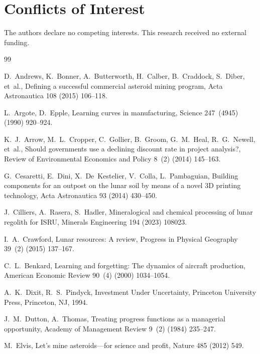 \documentclass[preprint,12pt]{elsarticle}
\begin{document}
\section*{Conflicts of Interest}

The authors declare no competing interests. This research received no external funding.

\begin{thebibliography}{99}

D.~Andrews, K.~Bonner, A.~Butterworth, H.~Calber, B.~Craddock, S.~Diber, et~al.,
\newblock Defining a successful commercial asteroid mining program,
\newblock Acta Astronautica 108 (2015) 106--118.

L.~Argote, D.~Epple,
\newblock Learning curves in manufacturing,
\newblock Science 247~(4945) (1990) 920--924.

K.~J.~Arrow, M.~L.~Cropper, C.~Gollier, B.~Groom, G.~M.~Heal, R.~G.~Newell, et~al.,
\newblock Should governments use a declining discount rate in project analysis?,
\newblock Review of Environmental Economics and Policy 8~(2) (2014) 145--163.

G.~Cesaretti, E.~Dini, X.~De~Kestelier, V.~Colla, L.~Pambaguian,
\newblock Building components for an outpost on the lunar soil by means of a novel 3D printing technology,
\newblock Acta Astronautica 93 (2014) 430--450.

J.~Cilliers, A.~Rasera, S.~Hadler,
\newblock Mineralogical and chemical processing of lunar regolith for ISRU,
\newblock Minerals Engineering 194 (2023) 108023.

I.~A.~Crawford,
\newblock Lunar resources: A review,
\newblock Progress in Physical Geography 39~(2) (2015) 137--167.

C.~L.~Benkard,
\newblock Learning and forgetting: The dynamics of aircraft production,
\newblock American Economic Review 90~(4) (2000) 1034--1054.

A.~K.~Dixit, R.~S.~Pindyck,
\newblock Investment Under Uncertainty,
\newblock Princeton University Press, Princeton, NJ, 1994.

J.~M.~Dutton, A.~Thomas,
\newblock Treating progress functions as a managerial opportunity,
\newblock Academy of Management Review 9~(2) (1984) 235--247.

M.~Elvis,
\newblock Let's mine asteroids---for science and profit,
\newblock Nature 485 (2012) 549.


\end{thebibliography}
\end{document}
